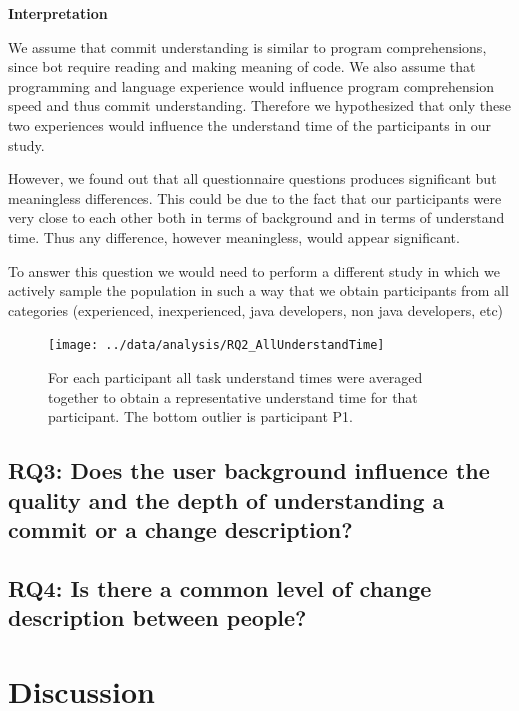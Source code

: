 \documentclass[letterpaper]{article}
\begin{document}
\textbf{Interpretation}

We assume that commit understanding is similar to program comprehensions, since bot require reading and making meaning of code.
We also assume that programming and language experience would influence program comprehension speed and thus commit understanding.
Therefore we hypothesized that only these two experiences would influence the understand time of the participants in our study.

However, we found out that all questionnaire questions produces significant but meaningless differences.
This could be due to the fact that our participants were very close to each  other both in terms of background and in terms of understand time.
Thus any difference, however meaningless, would appear significant.

To answer this question we would need to perform a different study in which we actively sample the population in such a way that we obtain participants from all categories (experienced, inexperienced, java developers, non java developers, etc)

\begin{figure}[H]
    \centering
    \texttt{[image: ../data/analysis/RQ2\_AllUnderstandTime]}
    \caption{For each participant all task understand times were averaged together to obtain a representative understand time for that participant. The bottom outlier is participant P1.}
    \label{fig:rq2-understandTimes}
\end{figure}


\subsection{RQ3: Does the user background influence the quality and the depth of understanding a commit or a change description?}

\subsection{RQ4: Is there a common level of change description between people?}

\section{Discussion}
\end{document}
